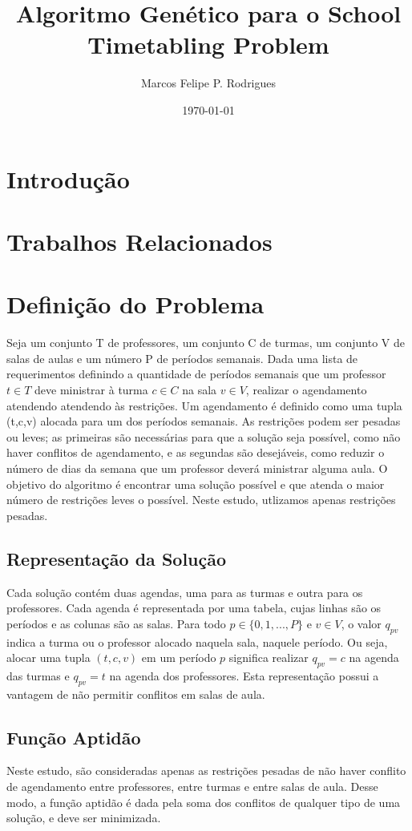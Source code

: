 \documentclass{article}
\title{Algoritmo Genético para o School Timetabling Problem}
\author{Marcos Felipe P. Rodrigues}
\date{\today}
\begin{document}
\maketitle
\text

\section{Introdução}
\section{Trabalhos Relacionados}
\section{Definição do Problema}
Seja um conjunto T de professores, um conjunto C de turmas, um conjunto V de
salas de aulas e um número P de períodos semanais. Dada uma lista de
requerimentos definindo a quantidade de períodos semanais que um professor $ t\in T $ 
deve ministrar à turma $ c \in C $ na sala $ v \in V $, realizar o agendamento
atendendo atendendo às restrições. Um agendamento é definido como uma tupla
(t,c,v) alocada para um dos períodos semanais. As restrições podem ser pesadas
ou leves; as primeiras são necessárias para que a solução seja possível, como
não haver conflitos de agendamento, e as segundas são desejáveis, como reduzir o
número de dias da semana que um professor deverá ministrar alguma aula. O
objetivo do algoritmo é encontrar uma solução possível e que atenda o maior
número de restrições leves o possível. Neste estudo, utlizamos apenas restrições
pesadas.

  \subsection{Representação da Solução}
  Cada solução contém duas agendas, uma para as turmas e outra para os
  professores. Cada agenda é representada por uma tabela, cujas linhas são os
  períodos e as colunas são as salas. Para todo $ p \in \{0,1,...,P\} $ e 
  $ v \in V $, o valor $ q_{pv} $ indica a turma ou o professor alocado
  naquela sala, naquele período. Ou seja, alocar uma tupla $ (t,c,v) $ em um período
  $ p $ significa realizar $ q_{pv} = c $ na agenda das turmas e
  $ q_{pv} = t $ na agenda dos professores. Esta representação possui a
  vantagem de não permitir conflitos em salas de aula.

  \subsection{Função Aptidão}
  Neste estudo, são consideradas apenas as restrições pesadas de não haver
  conflito de agendamento entre professores, entre turmas e entre salas de aula.
  Desse modo, a função aptidão é dada pela soma dos conflitos de qualquer tipo
  de uma solução, e deve ser minimizada.
\end{document}
